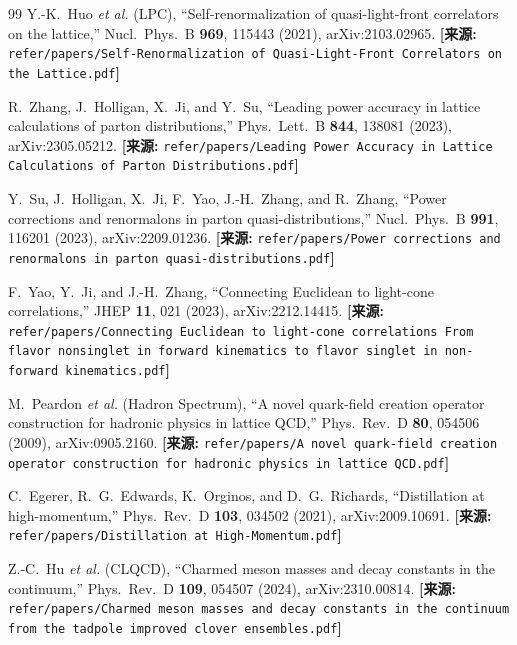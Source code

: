 \documentclass[12pt,a4paper]{ctexart}
\theoremstyle{definition}
\begin{document}
\begin{thebibliography}{99}
Y.-K.~Huo \textit{et al.} (LPC),
``Self-renormalization of quasi-light-front correlators on the lattice,''
Nucl.\ Phys.\ B \textbf{969}, 115443 (2021), arXiv:2103.02965.
\quad\textbf{[来源:} \texttt{refer/papers/Self-Renormalization of Quasi-Light-Front Correlators on the Lattice.pdf}\textbf{]}

R.~Zhang, J.~Holligan, X.~Ji, and Y.~Su,
``Leading power accuracy in lattice calculations of parton distributions,''
Phys.\ Lett.\ B \textbf{844}, 138081 (2023), arXiv:2305.05212.
\quad\textbf{[来源:} \texttt{refer/papers/Leading Power Accuracy in Lattice Calculations of Parton Distributions.pdf}\textbf{]}

Y.~Su, J.~Holligan, X.~Ji, F.~Yao, J.-H.~Zhang, and R.~Zhang,
``Power corrections and renormalons in parton quasi-distributions,''
Nucl.\ Phys.\ B \textbf{991}, 116201 (2023), arXiv:2209.01236.
\quad\textbf{[来源:} \texttt{refer/papers/Power corrections and renormalons in parton quasi-distributions.pdf}\textbf{]}

F.~Yao, Y.~Ji, and J.-H.~Zhang,
``Connecting Euclidean to light-cone correlations,''
JHEP \textbf{11}, 021 (2023), arXiv:2212.14415.
\quad\textbf{[来源:} \texttt{refer/papers/Connecting Euclidean to light-cone correlations From flavor nonsinglet in forward kinematics to flavor singlet in non-forward kinematics.pdf}\textbf{]}

M.~Peardon \textit{et al.} (Hadron Spectrum),
``A novel quark-field creation operator construction for hadronic physics in lattice QCD,''
Phys.\ Rev.\ D \textbf{80}, 054506 (2009), arXiv:0905.2160.
\quad\textbf{[来源:} \texttt{refer/papers/A novel quark-field creation operator construction for hadronic physics in lattice QCD.pdf}\textbf{]}

C.~Egerer, R.~G.~Edwards, K.~Orginos, and D.~G.~Richards,
``Distillation at high-momentum,''
Phys.\ Rev.\ D \textbf{103}, 034502 (2021), arXiv:2009.10691.
\quad\textbf{[来源:} \texttt{refer/papers/Distillation at High-Momentum.pdf}\textbf{]}

Z.-C.~Hu \textit{et al.} (CLQCD),
``Charmed meson masses and decay constants in the continuum,''
Phys.\ Rev.\ D \textbf{109}, 054507 (2024), arXiv:2310.00814.
\quad\textbf{[来源:} \texttt{refer/papers/Charmed meson masses and decay constants in the continuum from the tadpole improved clover ensembles.pdf}\textbf{]}


\end{thebibliography}
\end{document}
